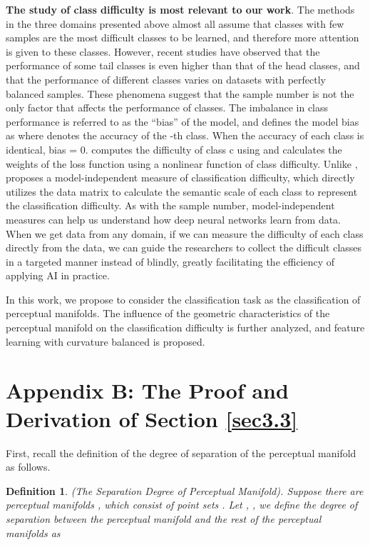 \documentclass[10pt,twocolumn,letterpaper]{article}
\newtheorem{definition}{Definition}
\begin{document}
\textbf{The study of class difficulty is most relevant to our work}. The methods in the three domains presented above almost all assume that classes with few samples are the most difficult classes to be learned, and therefore more attention is given to these classes. However, recent studies \cite{paper27,paper28} have observed that the performance of some tail classes is even higher than that of the head classes, and that the performance of different classes varies on datasets with perfectly balanced samples. These phenomena suggest that the sample number is not the only factor that affects the performance of classes. The imbalance in class performance is referred to as the ``bias'' of the model, and \cite{paper27} defines the model bias as  where  denotes the accuracy of the -th class. When the accuracy of each class is identical, bias = 0. \cite{paper27} computes the difficulty of class c using  and calculates the weights of the loss function using a nonlinear function of class difficulty. Unlike \cite{paper27}, \cite{paper28} proposes a model-independent measure of classification difficulty, which directly utilizes the data matrix to calculate the semantic scale of each class to represent the classification difficulty. As with the sample number, model-independent measures can help us understand how deep neural networks learn from data. When we get data from any domain, if we can measure the difficulty of each class directly from the data, we can guide the researchers to collect the difficult classes in a targeted manner instead of blindly, greatly facilitating the efficiency of applying AI in practice. 

In this work, we propose to consider the classification task as the classification of perceptual manifolds. The influence of the geometric characteristics of the perceptual manifold on the classification difficulty is further analyzed, and feature learning with curvature balanced is proposed. 


\section*{Appendix B: The Proof and Derivation of Section \ref{sec3.3}}
\label{secB}

First, recall the definition of the degree of separation of the perceptual manifold as follows.

\begin{definition}
(The Separation Degree of Perceptual Manifold). Suppose there are  perceptual manifolds , which consist of point sets . Let , , we define the degree of separation between the perceptual manifold  and the rest of the perceptual manifolds as 
\end{definition}
\end{document}
